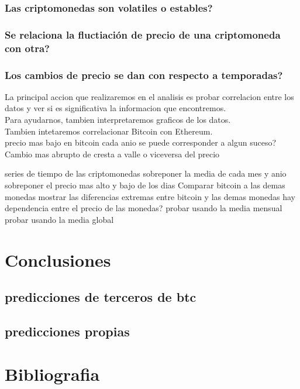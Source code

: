\documentclass[12pt,letterpaper]{article}
\begin{document}
	\subsubsection*{Las criptomonedas son volatiles o estables?}
	\subsubsection*{Se relaciona la fluctiaci\'on de precio de una criptomoneda con otra?}
	\subsubsection*{Los cambios de precio se dan con respecto a temporadas?}




    La principal accion que realizaremos en el analisis es probar correlacion entre los datos y ver si es significativa la informacion que encontremos.
    \\
    Para ayudarnos, tambien interpretaremos graficos de los datos.
    \\
    Tambien intetaremos correlacionar Bitcoin con Ethereum.
    \\
    precio mas bajo en bitcoin cada anio
        se puede corresponder a algun suceso?
    Cambio mas abrupto de cresta a valle o viceversa del precio

    series de tiempo de las criptomonedas
        sobreponer la media de cada mes y anio
    sobreponer el precio mas alto y bajo de los dias
    Comparar bitcoin a las demas monedas
        mostrar las diferencias extremas entre bitcoin y las demas monedas
    hay dependencia entre el precio de las monedas?
        probar usando la media mensual
        probar usando la media global

\section{Conclusiones}

	\subsection*{predicciones de terceros de btc}
	\subsection*{predicciones propias}
	
\section{Bibliografia}
\end{document}
